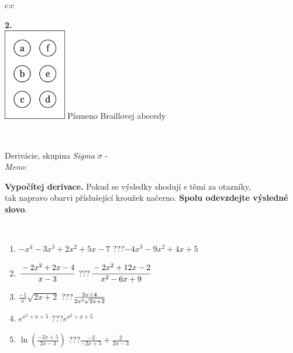 \documentclass[10pt]{report}
\begin{document}
\begin{tabular}{c:c}
\begin{minipage}[c][104.5mm][t]{0.5\linewidth}
\begin{center}
\begin{minipage}{0.20\linewidth}
\begin{center}
{\Huge\bfseries 2.} \\[2mm]
\includegraphics[height=40mm]{../images/braille.png}
{\small Písmeno Braillovej abecedy}
\end{center}
\end{minipage}
\end{center}
\end{minipage}
\\ \hdashline
\begin{minipage}[c][104.5mm][t]{0.5\linewidth}
\begin{center}
\vspace{7mm}
{\huge Derivácie, skupina \textit{Sigma $\sigma$} -}\\[5mm]
\textit{Meno:}\phantom{xxxxxxxxxxxxxxxxxxxxxxxxxxxxxxxxxxxxxxxxxxxxxxxxxxxxxxxxxxxxxxxxx}\\[5mm]
\begin{minipage}{0.95\linewidth}
\begin{center}
\textbf{Vypočítej derivace.} Pokud se výsledky shodují s těmi za otazníky,\\tak napravo obarvi příslušející kroužek načerno. \textbf{Spolu odevzdejte výsledné slovo}.
\end{center}
\end{minipage}
\\[1mm]
\begin{minipage}{0.79\linewidth}
\begin{center}
\begin{varwidth}{\linewidth}
\begin{enumerate}
\normalsize
\item $-x^4-3x^3+2x^2+5x-7$\quad \dotfill\; ???\;\dotfill \quad $-4x^3-9x^2+4x+5$
\item $\cfrac{-2x^2+2x-4}{x-3}$\quad \dotfill\; ???\;\dotfill \quad $\cfrac{-2x^2+12x-2}{x^2-6x+9}$
\item $\frac{-1}{x}\sqrt{2x+2}$\quad \dotfill\; ???\;\dotfill \quad $\frac{2x+4}{2x^2 \sqrt{\smash[b]{2x+2}}}$
\item $e^{x^2+x+5}$\quad \dotfill\; ???\;\dotfill \quad $e^{x^2+x+5}$
\item $\ln{\left(\frac{-2x+5}{2x-3}\right)}$\quad \dotfill\; ???\;\dotfill \quad $\frac{-2}{-2x+5}+\frac{2}{2x-3}$

\end{enumerate}
\end{varwidth}
\end{center}
\end{minipage}
\end{center}
\end{minipage}
\end{tabular}
\end{document}
